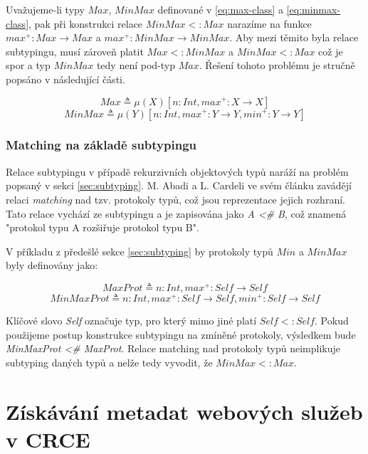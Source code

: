 \documentclass[czech,DP]{thesiskiv}
\begin{document}
Uvažujeme-li typy $Max$, $MinMax$ definované v \ref{eq:max-class} a \ref{eq:minmax-class}, pak při konstrukci relace $MinMax <: Max$ narazíme na funkce $max^+: Max \rightarrow Max$ a $max^+: MinMax \rightarrow MinMax$. Aby mezi těmito byla relace subtypingu, musí zároveň platit $Max <: MinMax$ a $MinMax <: Max$ což je spor a typ $MinMax$ tedy není pod-typ $Max$. Řešení tohoto problému je stručně popsáno v následující části.

\begin{equation}
	Max \triangleq \mu(X)[n:Int, max^+:X\rightarrow X] 
	\label{eq:max-class}
\end{equation} 
\begin{equation}
	MinMax \triangleq \mu(Y)[n:Int, max^+:Y\rightarrow Y, min^+: Y \rightarrow Y] 	
	\label{eq:minmax-class}
\end{equation}

\subsection{Matching na základě subtypingu}

Relace subtypingu v případě rekurzivních objektových typů naráží na problém popsaný v sekci \ref{sec:subtyping}. M. Abadi a L. Cardeli ve svém článku \cite{abadi1995subytping} zavádějí relaci \textit{matching} nad tzv. protokoly typů, což jsou reprezentace jejich rozhraní. Tato relace vychází ze subtypingu a je zapisována jako \textit{A <\# B}, což znamená "protokol typu A rozšiřuje protokol typu B". 

V příkladu z předešlé sekce \ref{sec:subtyping} by protokoly typů $Min$ a $MinMax$ byly definovány jako:

\begin{equation}
	MaxProt \triangleq n:Int, max^+: Self \rightarrow Self
\end{equation}
\begin{equation}
	MinMaxProt \triangleq n:Int, max^+: Self \rightarrow Self, min^+: Self \rightarrow Self
\end{equation}

Klíčové slovo \textit{Self} označuje typ, pro který mimo jiné platí $Self <: Self$. Pokud použijeme postup konstrukce subtypingu na zmíněné protokoly, výsledkem bude \textit{MinMaxProt <\# MaxProt}. Relace matching nad protokoly typů neimplikuje subtyping daných typů a nelže tedy vyvodit, že $MinMax <: Max$.


\chapter{Získávání metadat webových služeb v CRCE}
\label{sec:crce}
\end{document}
